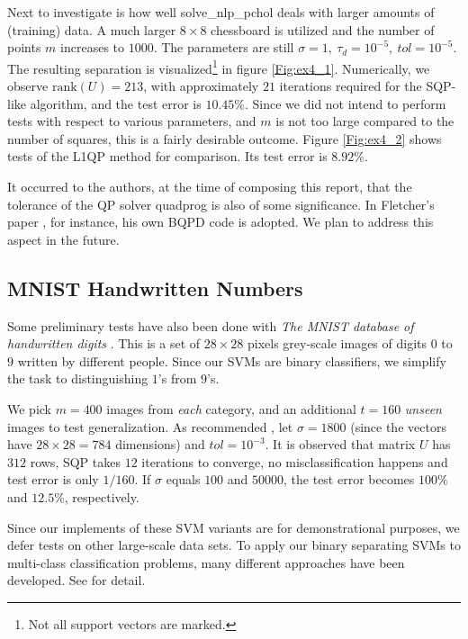 \documentclass[11pt,a4paper]{article}
\theoremstyle{definition}
\begin{document}
      Next to investigate is how well \textsf{solve\_nlp\_pchol} deals with larger amounts of (training) data. A much larger $8\times 8$ chessboard is utilized and the number of points $m$ increases to $1000$. The parameters are still $\sigma=1,~\tau_{d}=10^{-5},~tol=10^{-5}$. The resulting separation is visualized\footnote{Not all support vectors are marked.} in figure \ref{Fig:ex4_1}. Numerically, we observe $\text{rank}(U)=213$, with approximately $21$ iterations required for the SQP-like algorithm, and the test error is $10.45\%$. Since we did not intend to perform tests with respect to various parameters, and $m$ is not too large compared to the number of squares, this is a fairly desirable outcome. Figure \ref{Fig:ex4_2} shows tests of the L1QP method for comparison. Its test error is $8.92\%$.

      It occurred to the authors, at the time of composing this report, that the tolerance of the QP solver \textsf{quadprog} is also of some significance. In Fletcher's paper \cite{fletcher2010binary}, for instance, his own \textsf{BQPD} code is adopted. We plan to address this aspect in the future.

    \subsection{MNIST Handwritten Numbers\label{Sec:MNIST}}
      Some preliminary tests have also been done with \textit{The MNIST database of handwritten digits} \cite{lecun1998mnist}. This is a set of $28\times 28$ pixels grey-scale images of digits $0$ to $9$ written by different people. Since our SVMs are binary classifiers, we simplify the task to distinguishing $1$'s from $9$'s.

      We pick $m=400$ images from \emph{each} category, and an additional $t=160$ \emph{unseen} images to test generalization. As recommended \cite{fletcher2010binary}, let $\sigma=1800$ (since the vectors have $28\times 28=784$ dimensions) and $tol=10^{-3}$. It is observed that matrix $U$ has $312$ rows, SQP takes $12$ iterations to converge, no misclassification happens and test error is only $1/160$. If $\sigma$ equals $100$ and $50000$, the test error becomes $100\%$ and $12.5\%$, respectively.

      Since our implements of these SVM variants are for demonstrational purposes, we defer tests on other large-scale data sets. To apply our binary separating SVMs to multi-class classification problems, many different approaches have been developed. See \cite{hsu2002comparison,duan2005best} for detail.
\end{document}
